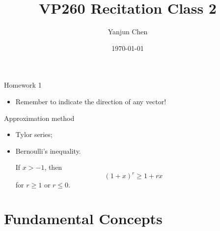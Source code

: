 \documentclass{beamer}
\title[VP260 RC]{VP260 Recitation Class 2} %
\author{Yanjun Chen} %
\institute[UM-SJTU JI] %
{
    University of Michigan - Shanghai Jiao Tong University Joint Institute\\%
\medskip
}
\date{\today} %
\begin{document}
\begin{frame}
    \titlepage %
\end{frame}


\begin{frame}{Homework 1}
    \begin{itemize}
        \item Remember to indicate the direction of any vector!
    \end{itemize}

    \begin{block}{Approximation method}
        \begin{itemize}
            \item Tylor series;
            \item Bernoulli's inequality.
            
            If $x > -1$, then
            \begin{equation}
                (1 + x)^r \geq 1 + rx
            \end{equation}
            for $r \geq 1$ or $r \leq 0$.
        \end{itemize}
    \end{block}

\end{frame}


\section{Fundamental Concepts} %

\end{document}

